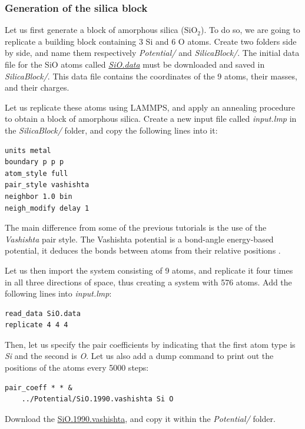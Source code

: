 \documentclass[9pt,tutorial]{livecoms}
\begin{document}
\subsubsection{Generation of the silica block}
\noindent Let us first generate a block of amorphous silica ($\text{SiO}_2$).
To do so, we are going to replicate a building block containing 3 Si and 6 O atoms.
Create two folders side by side, and name them respectively \textit{Potential/}
and \textit{SilicaBlock/}. The initial data file for the SiO atoms called
\href{https://raw.githubusercontent.com/lammpstutorials/lammpstutorials-article/main/files/tutorial6/SiO.data}{\textit{SiO.data}}
must be downloaded and saved in \textit{SilicaBlock/}. This data file contains
the coordinates of the 9 atoms, their masses, and their charges.

Let us replicate these atoms using LAMMPS, and apply an annealing procedure to
obtain a block of amorphous silica. Create a new input file called \textit{input.lmp}
in the \textit{SilicaBlock/} folder, and copy
the following lines into it:
{\normalsize \begin{verbatim}
units metal
boundary p p p
atom_style full
pair_style vashishta
neighbor 1.0 bin
neigh_modify delay 1
\end{verbatim}}
The main difference from some of the previous tutorials is the use of the \textit{Vashishta}
pair style. The Vashishta potential is a bond-angle energy-based potential, it deduces
the bonds between atoms from their relative positions \cite{vashishta1990interaction}.

Let us then import the system consisting of 9 atoms, and replicate it four times
in all three directions of space, thus creating a system with 576 atoms. Add the
following lines into \textit{input.lmp}:
{\normalsize \begin{verbatim}
read_data SiO.data
replicate 4 4 4
\end{verbatim}}
Then, let us specify the pair coefficients by indicating that the first atom type
is \textit{Si} and the second is \textit{O}. Let us also add a dump command to
print out the positions of the atoms every 5000 steps:
{\normalsize \begin{verbatim}
pair_coeff * * &
    ../Potential/SiO.1990.vashishta Si O
\end{verbatim}}
Download the \href{https://raw.githubusercontent.com/lammpstutorials/lammpstutorials-article/main/files/tutorial6/SiO.1990.vashishta}{SiO.1990.vashishta},
and copy it within the \textit{Potential/} folder.
\end{document}
